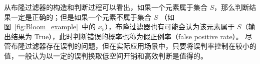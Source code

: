 


从布隆过滤器的构造和判断过程可以看出，如果一个元素属于集合 $S$，那么判断结果一定是正确的；但是如果一个元素不属于集合 $S$ （如图~\ref{fig:Bloom_example}~中的 $x_5$），布隆过滤器也有可能会认为该元素属于 $S$（输出结果为 True），此时判断错误的概率也称为假正例率（false positive rate）。
尽管布隆过滤器存在误判的问题，但在实际应用场景中，只要将误判率控制在较小的值，一般认为以一定的误判换取低空间开销和高效判断是值得的。

